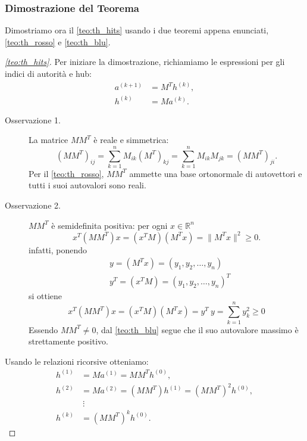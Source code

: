 \newpage

\subsubsection{Dimostrazione del Teorema}

Dimostriamo ora il \autoref{teo:th_hits} usando i due teoremi appena enunciati, \autoref{teo:th_rosso} e \autoref{teo:th_blu}.

\begin{proof}[\autoref{teo:th_hits}]
    Per iniziare la dimostrazione, richiamiamo le espressioni per gli indici di autorità e hub:
    \[
    \begin{aligned}
        a^{(k+1)} &= M^T h^{(k)},\\
        h^{(k)}   &= M a^{(k)}.
    \end{aligned}
    \]

    \begin{description}
        \item[Osservazione 1.] La matrice $M M^T$ è reale e simmetrica:
        \[
        (M M^T)_{ij}=\sum_{k=1}^{n}M_{ik}(M^T)_{kj}=\sum_{k=1}^{n}M_{ik}M_{jk}=(M M^T)_{ji}.
        \]
        Per il \autoref{teo:th_rosso}, $M M^T$ ammette una base ortonormale di autovettori e tutti i suoi autovalori sono reali.
        \item[Osservazione 2.] $M M^T$ è semidefinita positiva: per ogni $x\in\mathbb{R}^n$
        \[
        x^T(M M^T)x=(x^T M)(M^T x)=\|M^T x\|^2\ge 0.
        \]
        infatti, ponendo
        \begin{align*}
            &y = (M^T x) = (y_1, y_2, \dots, y_n) \\
            &y^T = (x^T M) = (y_1, y_2, \dots, y_n)^T
        \end{align*}
        si ottiene
        \[
        x^T(M M^T)x = (x^T M)(M^T x) = y^T\ y = \sum_{k=1}^{n} y^2_{k} \ge 0
        \]
        Essendo $M M^T\neq 0$, dal \autoref{teo:th_blu} segue che il suo autovalore massimo è strettamente positivo.
    \end{description}

    Usando le relazioni ricorsive otteniamo:
    \[
    \begin{aligned}
        h^{(1)} &= M a^{(1)} = M M^T h^{(0)},\\
        h^{(2)} &= M a^{(2)} = (M M^T) h^{(1)} = (M M^T)^2 h^{(0)},\\
        &\ \vdots\\
        h^{(k)} &= (M M^T)^k h^{(0)}.
    \end{aligned}
    \]


\end{proof}
